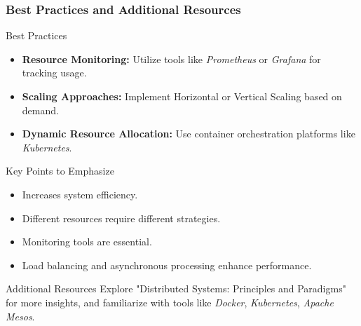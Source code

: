 \documentclass{beamer}
\begin{document}
\begin{frame}[fragile]
    \frametitle{Best Practices and Additional Resources}
    \begin{block}{Best Practices}
        \begin{itemize}
            \item \textbf{Resource Monitoring:} Utilize tools like \textit{Prometheus} or \textit{Grafana} for tracking usage.
            \item \textbf{Scaling Approaches:} Implement Horizontal or Vertical Scaling based on demand.
            \item \textbf{Dynamic Resource Allocation:} Use container orchestration platforms like \textit{Kubernetes}.
        \end{itemize}
    \end{block}
    
    \begin{block}{Key Points to Emphasize}
        \begin{itemize}
            \item Increases system efficiency.
            \item Different resources require different strategies.
            \item Monitoring tools are essential.
            \item Load balancing and asynchronous processing enhance performance.
        \end{itemize}
    \end{block}
    
    \begin{block}{Additional Resources}
        Explore "Distributed Systems: Principles and Paradigms" for more insights, and familiarize with tools like \textit{Docker}, \textit{Kubernetes}, \textit{Apache Mesos}.
    \end{block}
\end{frame}
\end{document}
